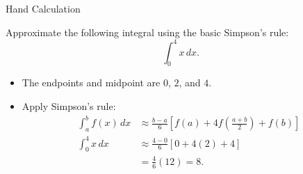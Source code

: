 \documentclass[10pt]{beamer}
\begin{document}

\begin{frame}{Hand Calculation}

\begin{example}
    Approximate the following integral using the basic Simpson's rule:
    \[
        \int_0^4 x\,dx.
    \]
\end{example}

\begin{itemize}
    \item The endpoints and midpoint are $0$, $2$, and $4$.
    \item Apply Simpson's rule:
    \[
    \begin{aligned}
        \int_a^b f(x)\,dx
        &\approx \frac{b-a}{6}
        \left[f(a)+4f\left(\frac{a+b}{2}\right)+f(b)\right]\\[2mm]
        \int_0^4 x\,dx
        &\approx \frac{4-0}{6}\left[0+4(2)+4\right]\\
        &= \frac{4}{6}(12)=8.
    \end{aligned}
    \]
\end{itemize}



\end{frame}

\end{document}
